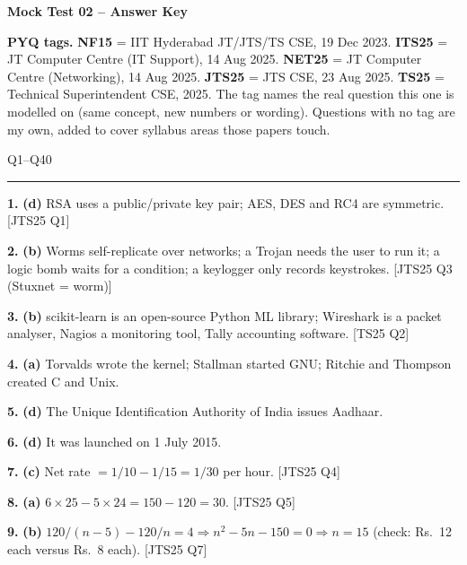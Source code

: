 \documentclass[11pt,a4paper]{article}
\newcommand{\sect}[2]{\vspace{8pt}{\large\bfseries\color{ember}#1}\hfill{\small\color{slate}#2}\par
{\color{slate}\hrule}\vspace{6pt}}
\begin{document}
\begin{center}
{\LARGE\bfseries\color{slate}Mock Test 02 -- Answer Key}
\end{center}
\textbf{PYQ tags.} \textbf{NF15} = IIT Hyderabad JT/JTS/TS CSE, 19 Dec 2023. \textbf{ITS25} = JT Computer Centre (IT Support), 14 Aug 2025.
\textbf{NET25} = JT Computer Centre (Networking), 14 Aug 2025. \textbf{JTS25} = JTS CSE, 23 Aug 2025. \textbf{TS25} = Technical Superintendent CSE, 2025.
The tag names the real question this one is modelled on (same concept, new numbers or wording).
Questions with no tag are my own, added to cover syllabus areas those papers touch.

\sect{Part A}{Q1--Q40}\small
\noindent\textbf{1.} \textbf{(d)} RSA uses a public/private key pair; AES, DES and RC4 are symmetric. {\color{ember}\scriptsize[JTS25 Q1]}\par\vspace{3pt}
\noindent\textbf{2.} \textbf{(b)} Worms self-replicate over networks; a Trojan needs the user to run it; a logic bomb waits for a condition; a keylogger only records keystrokes. {\color{ember}\scriptsize[JTS25 Q3 (Stuxnet = worm)]}\par\vspace{3pt}
\noindent\textbf{3.} \textbf{(b)} scikit-learn is an open-source Python ML library; Wireshark is a packet analyser, Nagios a monitoring tool, Tally accounting software. {\color{ember}\scriptsize[TS25 Q2]}\par\vspace{3pt}
\noindent\textbf{4.} \textbf{(a)} Torvalds wrote the kernel; Stallman started GNU; Ritchie and Thompson created C and Unix.\par\vspace{3pt}
\noindent\textbf{5.} \textbf{(d)} The Unique Identification Authority of India issues Aadhaar.\par\vspace{3pt}
\noindent\textbf{6.} \textbf{(d)} It was launched on 1 July 2015.\par\vspace{3pt}
\noindent\textbf{7.} \textbf{(c)} Net rate $=1/10-1/15=1/30$ per hour. {\color{ember}\scriptsize[JTS25 Q4]}\par\vspace{3pt}
\noindent\textbf{8.} \textbf{(a)} $6\times25-5\times24=150-120=30$. {\color{ember}\scriptsize[JTS25 Q5]}\par\vspace{3pt}
\noindent\textbf{9.} \textbf{(b)} $120/(n-5)-120/n=4 \Rightarrow n^2-5n-150=0 \Rightarrow n=15$ (check: Rs.\ 12 each versus Rs.\ 8 each). {\color{ember}\scriptsize[JTS25 Q7]}\par\vspace{3pt}
\end{document}
